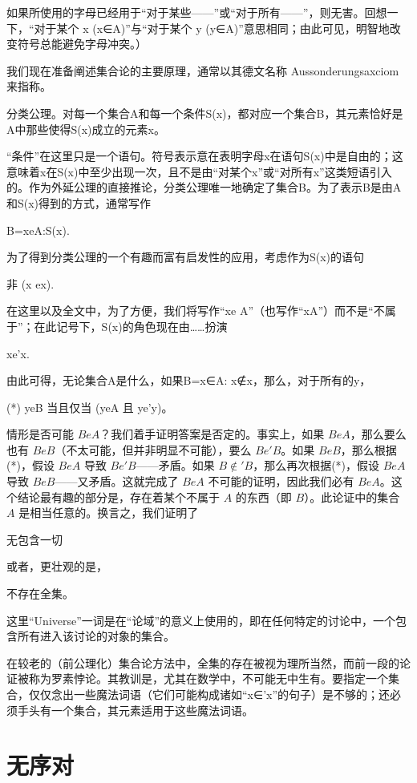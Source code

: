 \documentclass[12pt,a4paper]{ctexbook}
\theoremstyle{definition}
\theoremstyle{remark}
\begin{document}
如果所使用的字母已经用于“对于某些——”或“对于所有——”，则无害。回想一下，“对于某个 x (x∈A)”与“对于某个 y (y∈A)”意思相同；由此可见，明智地改变符号总能避免字母冲突。）

我们现在准备阐述集合论的主要原理，通常以其德文名称 Aussonderungsaxciom 来指称。

分类公理。对每一个集合A和每一个条件S(x)，都对应一个集合B，其元素恰好是A中那些使得S(x)成立的元素x。

“条件”在这里只是一个语句。符号表示意在表明字母x在语句S(x)中是自由的；这意味着x在S(x)中至少出现一次，且不是由“对某个x”或“对所有x”这类短语引入的。作为外延公理的直接推论，分类公理唯一地确定了集合B。为了表示B是由A和S(x)得到的方式，通常写作

B={xeA:S(x)}.

为了得到分类公理的一个有趣而富有启发性的应用，考虑作为S(x)的语句

非 (x ex).

在这里以及全文中，为了方便，我们将写作“xe A”（也写作“xA”）而不是“不属于”；在此记号下，S(x)的角色现在由……扮演

xe'x.

由此可得，无论集合A是什么，如果B={x∈A: x∉x}，那么，对于所有的y，

(*) yeB 当且仅当 (yeA 且 ye'y)。

情形是否可能 \(BeA\)？我们着手证明答案是否定的。事实上，如果 \(BeA\)，那么要么也有 \(BeB\)（不太可能，但并非明显不可能），要么 \(Be'B\)。如果 \(BeB\)，那么根据(*)，假设 \(BeA\) 导致 \(Be'B\)——矛盾。如果 \(B \notin' B\)，那么再次根据(*)，假设 \(BeA\) 导致 \(BeB\)——又矛盾。这就完成了 \(BeA\) 不可能的证明，因此我们必有 \(BeA\)。这个结论最有趣的部分是，存在着某个不属于 \(A\) 的东西（即 \(B\)）。此论证中的集合 \(A\) 是相当任意的。换言之，我们证明了

无包含一切

或者，更壮观的是，

不存在全集。

这里“Universe”一词是在“论域”的意义上使用的，即在任何特定的讨论中，一个包含所有进入该讨论的对象的集合。

在较老的（前公理化）集合论方法中，全集的存在被视为理所当然，而前一段的论证被称为罗素悖论。其教训是，尤其在数学中，不可能无中生有。要指定一个集合，仅仅念出一些魔法词语（它们可能构成诸如“x∈'x”的句子）是不够的；还必须手头有一个集合，其元素适用于这些魔法词语。


\chapter{无序对}
\end{document}
